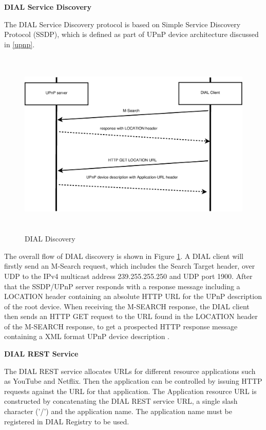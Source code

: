 \textbf{DIAL Service Discovery}

The DIAL Service Discovery protocol is based on Simple Service Discovery 
Protocol (SSDP), which is defined as part of UPnP device architecture discussed 
in \ref{upnp}.

\begin{figure}[htb] \centering 
\includegraphics[height=9cm]{charts/dial_discovery} 
\caption{DIAL Discovery \label{dial_discovery}} 
\end{figure} 

The overall flow of DIAL discovery is shown in Figure \ref{dial_discovery}. A
DIAL client will firstly send an M-Search request, which includes  the Search
Target header, over UDP to the IPv4 multicast address 239.255.255.250 and UDP
port 1900. After that the SSDP/UPnP server responds with a response message
including a LOCATION header containing an absolute HTTP URL for the UPnP
description of the root device. When receiving the M-SEARCH response, the DIAL
client then sends an HTTP GET request to the URL found in the LOCATION header
of the M-SEARCH response, to get a prospected HTTP response message containing
a XML format UPnP device description \cite{dial}. 

\textbf{DIAL REST Service}

The DIAL REST service allocates URLs for different resource applications such as 
YouTube and Netflix. Then the application can be controlled by issuing HTTP 
requests against the URL for that application. The Application resource URL is 
constructed by concatenating the DIAL REST service URL, a single slash character 
('/') and the application name. The application name must be registered in DIAL 
Registry to be used.

